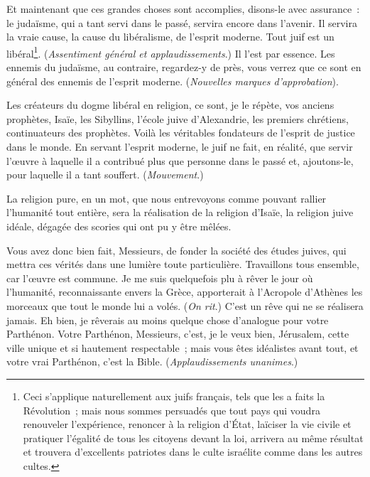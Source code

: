 \documentclass[french,twoside]{book} %
\newcommand\orgName[1]{#1}
\newcommand\persName[1]{#1}
\newcommand\placeName[1]{#1}
\begin{document}
Et maintenant que ces grandes choses sont accomplies, disons-le avec assurance : le judaïsme, qui a tant servi dans le passé, servira encore dans l’avenir. Il servira la vraie cause, la cause du libéralisme, de l’esprit moderne. Tout juif est un libéral\footnote{Ceci s’applique naturellement aux juifs français, tels que les a faits la Révolution ; mais nous sommes persuadés que tout pays qui voudra renouveler l’expérience, renoncer à la religion d’État, laïciser la vie civile et pratiquer l’égalité de tous les citoyens devant la loi, arrivera au même résultat et trouvera d’excellents patriotes dans le culte israélite comme dans les autres cultes.}. ({\itshape Assentiment général et applaudissements}.) Il l’est par essence. Les ennemis du judaïsme, au contraire, regardez-y de près, vous verrez que ce sont en général des ennemis de l’esprit moderne. ({\itshape Nouvelles marques d’approbation}).\par
Les créateurs du dogme libéral en religion, ce sont, je le répète, vos anciens prophètes, {\persName Isaïe}, les {\orgName Sibyllins}, l’{\orgName école juive d’Alexandrie}, les premiers chrétiens, continuateurs des prophètes. Voilà les véritables fondateurs de l’esprit de justice dans le monde. En servant l’esprit moderne, le juif ne fait, en réalité, que servir l’œuvre à laquelle il a contribué plus que personne dans le passé et, ajoutons-le, pour laquelle il a tant souffert. ({\itshape Mouvement}.)\par
La religion pure, en un mot, que nous entrevoyons comme pouvant rallier l’humanité tout entière, sera la réalisation de la religion d’Isaïe, la religion juive idéale, dégagée des scories qui ont pu y être mêlées.\par
Vous avez donc bien fait, Messieurs, de fonder la {\orgName société des études juives}, qui mettra ces vérités dans une lumière toute particulière. Travaillons tous ensemble, car l’œuvre est commune. Je me suis quelquefois plu à rêver le jour où l’humanité, reconnaissante envers la {\orgName Grèce}, apporterait à l’{\orgName Acropole} d’{\placeName Athènes} les morceaux que tout le monde lui a volés. ({\itshape On rit}.) C’est un rêve qui ne se réalisera jamais. Eh bien, je rêverais au moins quelque chose d’analogue pour votre {\orgName Parthénon}. Votre {\orgName Parthénon}, Messieurs, c’est, je le veux bien, {\placeName Jérusalem}, cette ville unique et si hautement respectable ; mais vous êtes idéalistes avant tout, et votre vrai {\orgName Parthénon}, c’est la Bible. ({\itshape Applaudissements unanimes}.)\par
\end{document}
